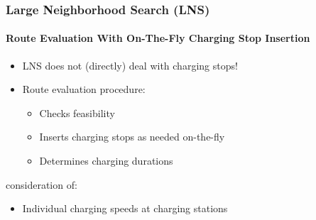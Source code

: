 \documentclass[aspectratio=1610]{beamer}
\newcommand{\important}[1]{{\color{green!60!black}#1}}
\begin{document}
\begin{frame}
	\frametitle{Large Neighborhood Search (LNS)}
	\framesubtitle{Route Evaluation With On-The-Fly Charging Stop Insertion}
	
\begin{itemize}
	\item \important{LNS does not (directly) deal with charging stops!}
	\medskip 
	\item Route evaluation procedure: 
		\smallskip
		\begin{itemize}
			\item Checks feasibility 
			\smallskip
			\item Inserts charging stops as needed on-the-fly
			\smallskip
			\item Determines charging durations 
		\end{itemize}
\end{itemize}

\bigskip

%

 consideration of: 
\smallskip
\begin{itemize}
	\item Individual charging speeds at charging stations
\end{itemize}
	
\end{frame}
\end{document}
